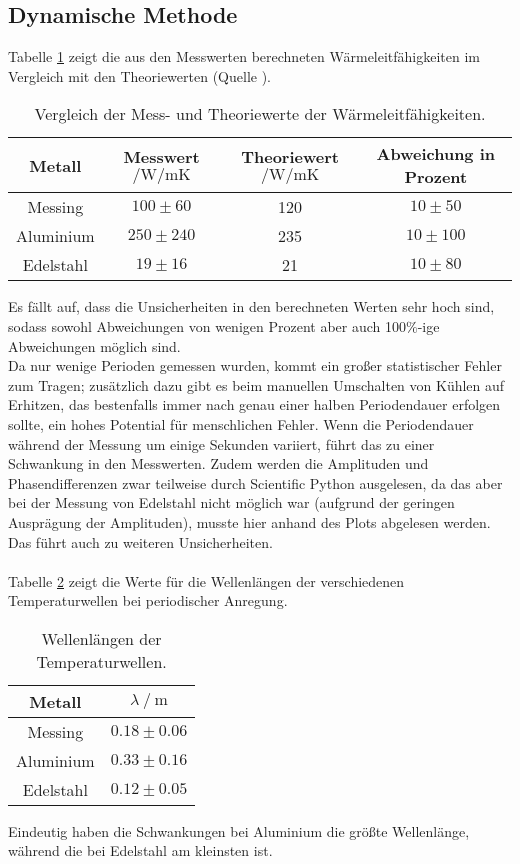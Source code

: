 \subsection{Dynamische Methode}
Tabelle \ref{tab:vergleich} zeigt die aus den Messwerten berechneten Wärmeleitfähigkeiten im Vergleich mit den Theoriewerten (Quelle \cite{litval}).
\begin{table}
    \centering
    \caption{Vergleich der Mess- und Theoriewerte der Wärmeleitfähigkeiten.}
    \label{tab:vergleich}
    \begin{tabular}{c c c c}
        \toprule
        Metall & Messwert$\mathbin{/} \si{\watt\per\m\kelvin}$ & Theoriewert$\mathbin{/} \si{\watt\per\m\kelvin}$ & Abweichung in Prozent \\
        \midrule
        Messing & $100 \pm 60 $ & 120 & $10 \pm 50$\\
        Aluminium & $250 \pm 240$ & 235 & $10 \pm 100$\\
        Edelstahl & $19 \pm 16$& 21 & $10 \pm 80$\\
        \bottomrule
    \end{tabular}
\end{table}

\noindent Es fällt auf, dass die Unsicherheiten in den berechneten Werten sehr hoch sind, sodass sowohl Abweichungen von wenigen Prozent aber auch 100$\%$-ige Abweichungen möglich sind.\\
Da nur wenige Perioden gemessen wurden, kommt ein großer statistischer Fehler zum Tragen; zusätzlich dazu gibt es beim manuellen Umschalten von Kühlen auf Erhitzen, das bestenfalls immer nach
genau einer halben Periodendauer erfolgen sollte, ein hohes Potential für menschlichen Fehler. Wenn die Periodendauer während der Messung um einige Sekunden variiert, führt das zu einer Schwankung
in den Messwerten. Zudem werden die Amplituden und Phasendifferenzen zwar teilweise durch Scientific Python ausgelesen, da das aber bei der Messung von Edelstahl nicht möglich 
war (aufgrund der geringen Ausprägung der Amplituden), musste hier anhand des Plots abgelesen werden. Das führt auch zu weiteren Unsicherheiten. \\%
\\

Tabelle \ref{tab:die} zeigt die Werte für die Wellenlängen der verschiedenen Temperaturwellen bei periodischer Anregung.

\begin{table}
    \centering
    \caption{Wellenlängen der Temperaturwellen.}
    \label{tab:die}
    \begin{tabular}{c c}
        \toprule
        Metall & $\lambda \mathbin{/} \si{\m}$ \\
        \midrule
        Messing & $0.18 \pm 0.06$\\
        Aluminium & $0.33 \pm 0.16$\\
        Edelstahl & $0.12 \pm 0.05$\\
        \bottomrule
    \end{tabular}
\end{table}

Eindeutig haben die Schwankungen bei Aluminium die größte Wellenlänge, während die bei Edelstahl am kleinsten ist. 
